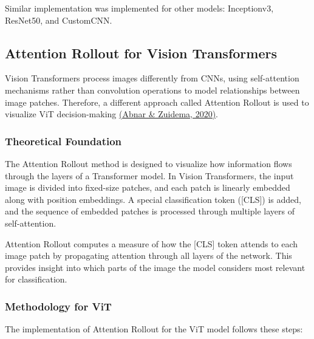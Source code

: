 \documentclass[a4paper,12pt]{report}
\begin{document}
Similar implementation was implemented for other models: Inceptionv3, ResNet50, and CustomCNN. 

\subsection{Attention Rollout for Vision Transformers}

Vision Transformers process images differently from CNNs, using self-attention mechanisms rather than convolution operations to model relationships between image patches. Therefore, a different approach called Attention Rollout is used to visualize ViT decision-making \href{https://arxiv.org/abs/2005.00928}{(Abnar \& Zuidema, 2020)}.

\subsubsection{Theoretical Foundation}

The Attention Rollout method is designed to visualize how information flows through the layers of a Transformer model. In Vision Transformers, the input image is divided into fixed-size patches, and each patch is linearly embedded along with position embeddings. A special classification token ([CLS]) is added, and the sequence of embedded patches is processed through multiple layers of self-attention.

Attention Rollout computes a measure of how the [CLS] token attends to each image patch by propagating attention through all layers of the network. This provides insight into which parts of the image the model considers most relevant for classification.

\subsubsection{Methodology for ViT}

The implementation of Attention Rollout for the ViT model follows these steps:
\end{document}
